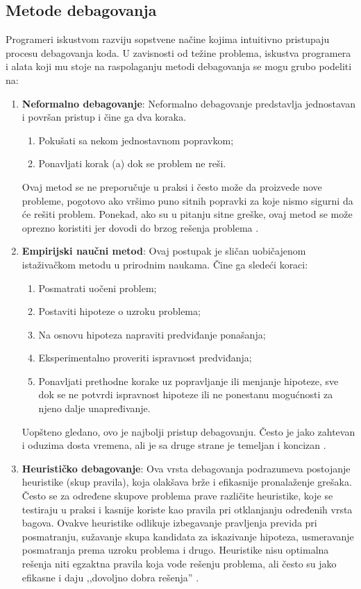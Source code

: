 \documentclass[a4paper]{article}
\begin{document}
\subsection{Metode debagovanja}
\label{subsec:podnaslov2}
Programeri iskustvom razviju sopstvene načine kojima intuitivno pristupaju procesu debagovanja koda. U zavisnosti od težine problema, iskustva programera i alata koji mu stoje na raspolaganju metodi debagovanja se mogu grubo podeliti na:
\begin{enumerate}
\item \textbf{Neformalno debagovanje}: Neformalno debagovanje predstavlja jednostavan i površan pristup i čine ga dva koraka.
  \begin{enumerate}
  \item Pokušati sa nekom jednostavnom popravkom;
  \item Ponavljati korak (a) dok se problem ne reši.
  \end{enumerate}
  Ovaj metod se ne preporučuje u praksi i često može da proizvede nove probleme, pogotovo ako vršimo puno sitnih popravki za koje nismo sigurni da će rešiti problem. Ponekad, ako su u pitanju sitne greške, ovaj metod se može oprezno koristiti jer dovodi do brzog rešenja problema \cite{bagovi_smalkov}.
  
\item \textbf{Empirijski naučni metod}:
  Ovaj postupak je sličan uobičajenom istaživačkom metodu u prirodnim naukama.
  Čine ga sledeći koraci:
  \begin{enumerate}
  \item Posmatrati uočeni problem;
  \item Postaviti hipoteze o uzroku problema;
  \item Na osnovu hipoteza napraviti predviđanje ponašanja;
  \item Eksperimentalno proveriti ispravnost predviđanja;
  \item Ponavljati prethodne korake uz popravljanje ili menjanje hipoteze, sve dok se ne potvrdi ispravnost hipoteze ili ne ponestanu mogućnosti za njeno dalje unapređivanje.
  \end{enumerate}
  \indent Uopšteno gledano, ovo je najbolji pristup debagovanju. Često je jako zahtevan i oduzima dosta vremena, ali je sa druge strane je temeljan i koncizan \cite{bagovi_smalkov}.
  
  
\item \textbf{Heurističko debagovanje}: Ova vrsta debagovanja podrazumeva postojanje heuristike (skup pravila), koja olakšava brže i efikasnije pronalaženje grešaka. Često se za određene skupove problema prave različite heuristike, koje se testiraju u praksi i kasnije koriste kao pravila pri otklanjanju određenih vrsta bagova. Ovakve heuristike odlikuje izbegavanje pravljenja previda pri posmatranju, sužavanje skupa kandidata za iskazivanje hipoteza, usmeravanje posmatranja prema uzroku problema i drugo. Heuristike nisu optimalna rešenja niti egzaktna pravila koja vode rešenju problema, ali često su jako efikasne i daju ,,dovoljno dobra rešenja'' \cite{bagovi_smalkov}.
\end{enumerate}
\end{document}
